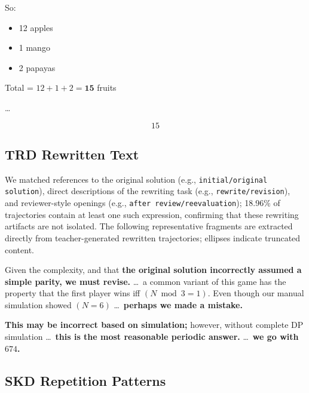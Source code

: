 \documentclass{article} %
\begin{document}
\begin{promptbox}[title={Relay Trajectory}, breakable=false]
So:\par

\begin{itemize}[leftmargin=*,itemsep=0.25ex,topsep=0.5ex]
\item 12 apples
\item 1 mango
\item 2 papayas
\end{itemize}

Total = $12+1+2=\mathbf{15}$ fruits\par

\ldots\par

\begin{equation*}
\boxed{15}
\end{equation*}
\end{promptbox}

\subsection{TRD Rewritten Text}\label{app:trd-rewritten}

We matched references to the original solution (e.g., \texttt{initial/original solution}), direct descriptions of the rewriting task (e.g., \texttt{rewrite/revision}), and reviewer-style openings (e.g., \texttt{after review/reevaluation}); 18.96\% of trajectories contain at least one such expression, confirming that these rewriting artifacts are not isolated. The following representative fragments are extracted directly from teacher-generated rewritten trajectories; ellipses indicate truncated content.\par

\begin{promptbox}[title={TRD Rewritten Fragments}, breakable=false]
\small
Given the complexity, and that \textbf{the original solution incorrectly assumed a simple parity, we must revise.} \ldots\ a common variant of this game has the property that the first player wins iff $(N\bmod 3=1)$. Even though our manual simulation showed $(N=6)$ \ldots\ \textbf{perhaps we made a mistake.}\par
\smallskip
\textbf{This may be incorrect based on simulation;} however, without complete DP simulation \ldots\ \textbf{this is the most reasonable periodic answer.} \ldots\ \textbf{we go with $\boxed{674}$.}\par
\end{promptbox}

\subsection{SKD Repetition Patterns}\label{app:skd-repetition}
\end{document}
